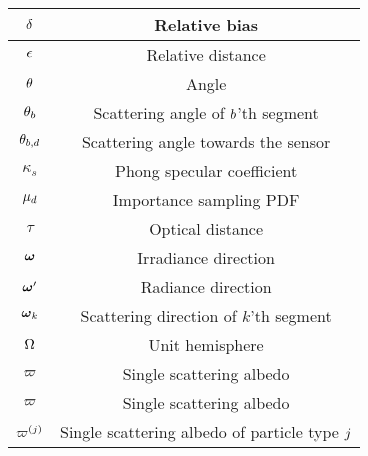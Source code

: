 \begin{center}
\begin{longtable}[c]{|c|c|}
$\delta$ & Relative bias \\ \hline 

$\epsilon$ & Relative distance \\ \hline



$\theta$ & Angle\\ \hline
$\theta_{b}$ & Scattering angle of $b$'th segment\\ \hline
$\theta_{b,d}$ & Scattering angle towards the sensor \\ \hline

$\kappa_s$ & Phong specular coefficient\\ \hline


$\mu_{d}$ & Importance sampling \ac{PDF} \\ \hline







$\tau$ & Optical distance \\ \hline 





$\boldsymbol{\omega}$ & Irradiance direction\\ \hline
$\boldsymbol{\omega}'$ & Radiance direction\\ \hline
$\boldsymbol{\omega}_k$ & Scattering direction of $k$'th segment\\ \hline
$\Omega$ & Unit hemisphere \\ \hline
$\varpi$ & Single scattering albedo \\ \hline
$\varpi$ & Single scattering albedo \\ \hline
$\varpi^{\left({j}\right)}$ & Single scattering albedo of particle type $j$ \\ \hline
\end{longtable}
\end{center}
\endgroup